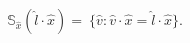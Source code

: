 \documentclass[preview]{standalone}
\begin{document}
\begin{align*}
\mathbb{S}_{\hat x}(\hat l \cdot \hat x) =\
                         \{ \hat v : \hat v \cdot \hat x = \hat l \cdot \hat x \}.
\end{align*}
\end{document}
